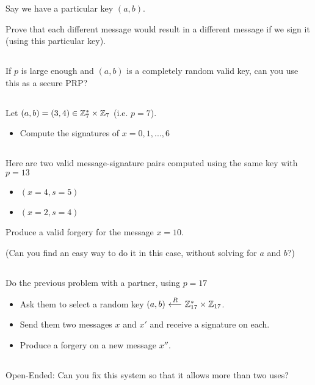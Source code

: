 \documentclass[12pt]{article}
\begin{document}
Say we have a particular key $(a, b)$.

Prove that each different message would result in a different message if we sign it (using this particular key).

\subsection{}

If $p$ is large enough and $(a, b)$ is a completely random valid key, can you use this as a secure PRP?



\subsection{}

Let $(a, b) = (3, 4) \in \mathbb{Z}_7^* \times \mathbb{Z}_7$ (i.e. $p = 7$).

\begin{itemize}
\item Compute the signatures of $x = 0, 1, ..., 6$
\end{itemize}

\subsection{}

Here are two valid message-signature pairs computed using the same key with $p=13$

\begin{itemize}
\item $(x=4, s=5)$
\item $(x=2, s=4)$
\end{itemize}

Produce a valid forgery for the message $x = 10$.

(Can you find an easy way to do it in this case, without solving for $a$ and $b$?)

\subsection{}

Do the previous problem with a partner, using $p = 17$

\begin{itemize}
\item Ask them to select a random key $(a, b) {\ \overset{R}\longleftarrow\ } \mathbb{Z}_{17}^* \times \mathbb{Z}_{17}$.
\item Send them two messages $x$ and $x'$ and receive a signature on each.
\item Produce a forgery on a new message $x''$.
\end{itemize}

\subsection{}

Open-Ended: Can you fix this system so that it allows more than two uses?
\end{document}
